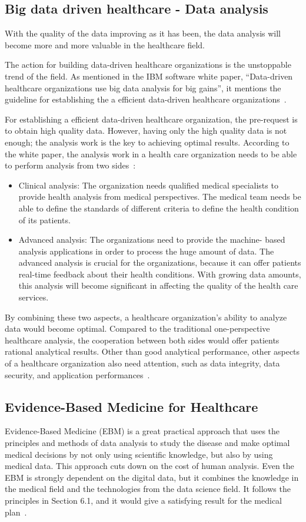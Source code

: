 \subsection{Big data driven healthcare - Data analysis}
With the quality of the data improving as it has been, the 
data analysis will become more and more valuable in the healthcare field. 

The action for building data-driven healthcare organizations is the 
unstoppable trend of the field. As mentioned in the 
IBM software white paper, 
``Data-driven healthcare organizations use big data analysis for big 
gains'', it mentions the guideline for establishing the a 
efficient data-driven 
healthcare organizations~\cite{ddh}.  

For establishing a efficient data-driven healthcare 
organization, the 
pre-request is to obtain high quality data. However, 
having only the high 
quality data is not enough; the analysis work is the 
key to achieving 
optimal results. According to the white paper, the analysis 
work in a health 
care organization needs to be able to perform analysis 
from two 
sides~\cite{ddh}: 
\begin{itemize}
	\item Clinical analysis: The organization 
	needs qualified medical specialists 
	to provide health analysis from medical perspectives. 
	The medical team 
	needs be able to define the standards of different 
	criteria to define the 
	health condition of its patients.
	\item Advanced analysis: 
	The organizations need to provide the machine-
	based analysis applications in order to process the 
	huge amount of data. 
	The advanced analysis is crucial for the organizations, 
	because it can offer 
	patients real-time feedback about their health conditions. 
	With growing data amounts, this analysis will 
	become significant 
	in affecting the quality of the health care services.
\end{itemize}
By combining these two aspects, a healthcare 
organization's ability to analyze data would become optimal. 
Compared to the traditional one-perspective 
healthcare analysis, the cooperation between 
both sides would offer patients rational 
analytical results. Other than good analytical performance, 
other aspects of a 
healthcare organization also need attention, such as data integrity, 
data security, and application performances~\cite{ddh}.

\subsection{Evidence-Based Medicine for Healthcare}
Evidence-Based Medicine (EBM) is a great practical approach
that uses the principles and methods of data analysis 
to study the disease
and make optimal medical decisions by not only using 
scientific knowledge, 
but also by using medical data. This
approach cuts down on the cost of human analysis. 
Even the EBM is strongly 
dependent on the digital data, but it combines the knowledge 
in the medical field
and the technologies from the data science field. 
It follows the principles in 
Section 6.1, and it would give a satisfying result for the medical 
plan~\cite{Masic2008}.


